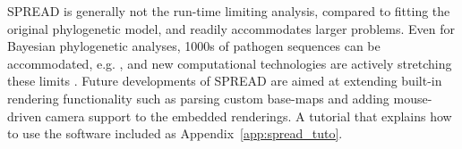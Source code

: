 SPREAD is generally not the run-time limiting analysis, compared to fitting the original phylogenetic model, and readily accommodates larger problems.
Even for Bayesian phylogenetic analyses, 1000s of pathogen sequences can be accommodated, e.g. \cite{Rambaut2008}, and new computational technologies are actively stretching these limits \citep{Suchard2009}.
Future developments of SPREAD are aimed at extending built-in rendering functionality such as parsing custom base-maps and adding mouse-driven camera support to the embedded renderings. 
A tutorial that explains how to use the software included as Appendix~\ref{app:spread_tuto}.
